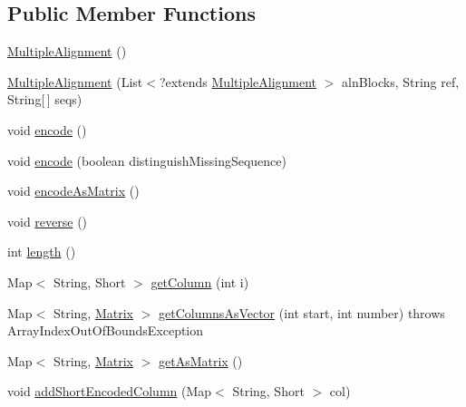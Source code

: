 \subsection*{Public Member Functions}
\begin{DoxyCompactItemize}
\item 
\hyperlink{classbroad_1_1core_1_1multiplealignment_1_1_multiple_alignment_a45e6efacdc9a06897bae9482fa1ae83a}{Multiple\+Alignment} ()
\item 
\hyperlink{classbroad_1_1core_1_1multiplealignment_1_1_multiple_alignment_a0dba07bb1f121c7cf717509a1eddbc90}{Multiple\+Alignment} (List$<$?extends \hyperlink{classbroad_1_1core_1_1multiplealignment_1_1_multiple_alignment}{Multiple\+Alignment} $>$ aln\+Blocks, String ref, String\mbox{[}$\,$\mbox{]} seqs)
\item 
void \hyperlink{classbroad_1_1core_1_1multiplealignment_1_1_multiple_alignment_a7c3d02390d68162a43979a1c19ff19e1}{encode} ()
\item 
void \hyperlink{classbroad_1_1core_1_1multiplealignment_1_1_multiple_alignment_aa8c49da366b1635b5a4e09b2afad4d96}{encode} (boolean distinguish\+Missing\+Sequence)
\item 
void \hyperlink{classbroad_1_1core_1_1multiplealignment_1_1_multiple_alignment_a292dffa7686a56b13b7f98a3adf33113}{encode\+As\+Matrix} ()
\item 
void \hyperlink{classbroad_1_1core_1_1multiplealignment_1_1_multiple_alignment_a8f6e8453396f6094a44858f6b8f66c31}{reverse} ()
\item 
int \hyperlink{classbroad_1_1core_1_1multiplealignment_1_1_multiple_alignment_a513a01a3a33806fa00494ce890cacf61}{length} ()
\item 
Map$<$ String, Short $>$ \hyperlink{classbroad_1_1core_1_1multiplealignment_1_1_multiple_alignment_ac6a2d951ce87a39003ad2190b35620d3}{get\+Column} (int i)
\item 
Map$<$ String, \hyperlink{class_jama_1_1_matrix}{Matrix} $>$ \hyperlink{classbroad_1_1core_1_1multiplealignment_1_1_multiple_alignment_a4fc36e3151292c38c16f65e792725894}{get\+Columns\+As\+Vector} (int start, int number)  throws Array\+Index\+Out\+Of\+Bounds\+Exception
\item 
Map$<$ String, \hyperlink{class_jama_1_1_matrix}{Matrix} $>$ \hyperlink{classbroad_1_1core_1_1multiplealignment_1_1_multiple_alignment_a2d26c015e85b447b9f1aa004e42fe191}{get\+As\+Matrix} ()
\item 
void \hyperlink{classbroad_1_1core_1_1multiplealignment_1_1_multiple_alignment_a534c74163e911bfbbcaded5a99b9f9e1}{add\+Short\+Encoded\+Column} (Map$<$ String, Short $>$ col)

\end{DoxyCompactItemize}

